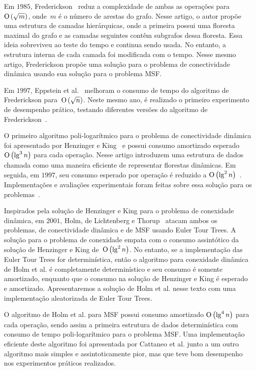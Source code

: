Em $1985$, Frederickson~\cite{frederickson1983data} reduz a complexidade de ambas as operações para $\text{O}\left(\sqrt{m}\right)$, onde~$m$ é o número de arestas do grafo. Nesse artigo, o autor propõe uma estrutura de camadas hierárquicas, onde a primeira possui uma floresta maximal do grafo e as camadas seguintes contêm subgrafos dessa floresta. Essa ideia sobreviveu ao teste do tempo e continua sendo usada. No entanto, a estrutura interna de cada camada foi modificada com o tempo. Nesse mesmo artigo, Frederickson propõe uma solução para o problema de conectividade dinâmica usando sua solução para o problema MSF.

Em $1997$, Eppstein et al.~\cite{Eppstein1992SparsificationaTF} melhoram o consumo de tempo do algoritmo de Frederickson para~$\text{O}\left(\sqrt{n}\right)$. Neste mesmo ano, é realizado o primeiro experimento de desempenho prático, testando diferentes versões do algoritmo de Frederickson~\cite{xpAnalyGiuseppe}.

O primeiro algoritmo poli-logarítmico para o problema de conectividade dinâmica foi apresentado por Henzinger e King~\cite{HenzingerKing} e possui consumo amortizado esperado $\text{O}\left(\lg^3 n\right)$ para cada operação. Nesse artigo introduzem uma estrutura de dados chamada  como uma maneira eficiente de representar florestas dinâmicas. Em seguida, em $1997$, seu consumo esperado por operação é reduzido a $\text{O}\left(\lg^2 n\right)$~\cite{HenzingerThorup}.  Implementações e avaliações experimentais foram feitas sobre essa solução para os problemas~\cite{EmpiricalStudy1997, EmpiricalStudy2002, Zaroliagis2002}.

Inspirados pela solução de Henzinger e King para o problema de conexidade dinâmica, em $2001$, Holm, de Lichtenberg e Thorup~\cite{poly_log} atacam ambos os problemas, de conectividade dinâmica e de MSF usando Euler Tour Trees. A solução para o problema de conexidade empata com o consumo assintótico da solução de Henzinger e King de~$\text{O}\left(\lg^2 n\right)$. No entanto, se a implementação das Euler Tour Trees for determinística, então o algoritmo para conexidade dinâmica de Holm et al. é completamente determinístico e seu consumo é somente amortizado, enquanto que o consumo na solução de Henzinger e King é esperado e amortizado. Apresentaremos a solução de Holm et al. nesse texto com uma implementação aleatorizada de Euler Tour Trees.

O algoritmo de Holm et al. para MSF possui consumo amortizado $\text{O}\left(\lg^4 n\right)$ para cada operação, sendo assim a primeira estrutura de dados determinística com consumo de tempo poli-logarítmico para o problema MSF. Uma implementação eficiente deste algoritmo foi apresentada por Cattaneo et al. \cite{xpstudy2002} junto a um outro algoritmo mais simples e assintoticamente pior, mas que teve bom desempenho nos experimentos práticos realizados.

